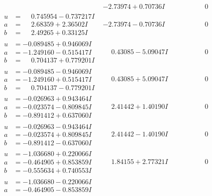 \documentclass[1p]{elsarticle_modified}
\theoremstyle{definition}
\begin{document}
$$\begin{array}{c|c|c}
 & -2.73974 + 0.70736 I & \phantom{-0.000000 } 0 \\ \hline\begin{aligned}
u &= \phantom{-}0.745954 - 0.737217 I \\
a &= \phantom{-}2.68359 + 2.36502 I \\
b &= \phantom{-}2.49265 + 0.33125 I\end{aligned}
 & -2.73974 - 0.70736 I & \phantom{-0.000000 } 0 \\ \hline\begin{aligned}
u &= -0.089485 + 0.946069 I \\
a &= -1.249160 - 0.515417 I \\
b &= \phantom{-}0.704137 + 0.779201 I\end{aligned}
 & \phantom{-}0.43085 - 5.09047 I & \phantom{-0.000000 } 0 \\ \hline\begin{aligned}
u &= -0.089485 - 0.946069 I \\
a &= -1.249160 + 0.515417 I \\
b &= \phantom{-}0.704137 - 0.779201 I\end{aligned}
 & \phantom{-}0.43085 + 5.09047 I & \phantom{-0.000000 } 0 \\ \hline\begin{aligned}
u &= -0.026963 + 0.943464 I \\
a &= -0.023574 - 0.809845 I \\
b &= -0.891412 + 0.637060 I\end{aligned}
 & \phantom{-}2.41442 + 1.40190 I & \phantom{-0.000000 } 0 \\ \hline\begin{aligned}
u &= -0.026963 - 0.943464 I \\
a &= -0.023574 + 0.809845 I \\
b &= -0.891412 - 0.637060 I\end{aligned}
 & \phantom{-}2.41442 - 1.40190 I & \phantom{-0.000000 } 0 \\ \hline\begin{aligned}
u &= -1.036680 + 0.220066 I \\
a &= -0.464905 + 0.853859 I \\
b &= -0.555634 + 0.740553 I\end{aligned}
 & \phantom{-}1.84155 + 2.77321 I & \phantom{-0.000000 } 0 \\ \hline\begin{aligned}
u &= -1.036680 - 0.220066 I \\
a &= -0.464905 - 0.853859 I \\

\end{aligned}
\end{array}$$
\end{document}
